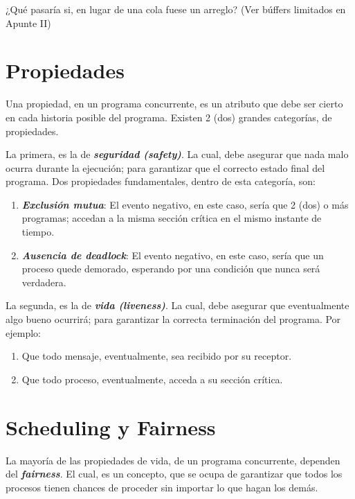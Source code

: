 \documentclass[a4paper, 10pt]{report}
\begin{document}
\begin{basic_box}
     ¿Qué pasaría si, en lugar de una cola fuese un arreglo? (Ver búffers limitados en Apunte II)
\end{basic_box}

\section{Propiedades}

Una propiedad, en un programa concurrente, es un atributo que debe ser cierto en cada historia posible del programa. Existen 2 (dos) grandes categorías, de propiedades.

La primera, es la de \textbf{\emph{seguridad (safety)}}. La cual, debe asegurar que nada malo ocurra durante la ejecución; para garantizar que el correcto estado final del programa. Dos propiedades fundamentales, dentro de esta categoría, son:

\begin{enumerate}
    \item \textbf{\emph{Exclusión mutua}}: El evento negativo, en este caso, sería que 2 (dos) o más programas; accedan a la misma sección crítica en el mismo instante de tiempo.
    \item \textbf{\emph{Ausencia de deadlock}}: El evento negativo, en este caso, sería que un proceso quede demorado, esperando por una condición que nunca será verdadera. 
\end{enumerate}

La segunda, es la de \textbf{\emph{vida (liveness)}}. La cual, debe asegurar que eventualmente algo bueno ocurrirá; para garantizar la correcta terminación del programa. Por ejemplo:

\begin{enumerate}
    \item Que todo mensaje, eventualmente, sea recibido por su receptor.
    \item Que todo proceso, eventualmente, acceda a su sección crítica.
\end{enumerate}

\section{Scheduling y Fairness}

La mayoría de las propiedades de vida, de un programa concurrente, dependen del \textbf{\emph{fairness}}. El cual, es un concepto, que se ocupa de garantizar que todos los procesos tienen chances de proceder sin importar lo que hagan los demás.
\end{document}
